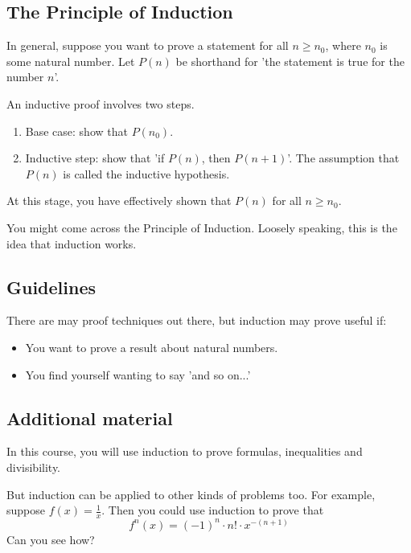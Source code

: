 \documentclass{scrreprt}
\begin{document}
\subsection*{The Principle of Induction}
In general, suppose you want to prove a statement for all $n \geq n_0$, where $n_0$ is some natural number. Let $P(n)$ be shorthand for 'the statement is true for the number $n$'.

An inductive proof involves two steps.
\begin{enumerate}
    \item Base case: show that $P(n_0)$.
    \item Inductive step: show that 'if $P(n)$, then $P(n + 1)$'. The assumption that $P(n)$ is called the inductive hypothesis.
\end{enumerate}
At this stage, you have effectively shown that $P(n)$ for all $n \geq n_0$.

You might come across the Principle of Induction. Loosely speaking, this is the idea that induction works.

\subsection*{Guidelines}
There are may proof techniques out there, but induction may prove useful if:

\begin{itemize}
    \item You want to prove a result about natural numbers.
    \item You find yourself wanting to say 'and so on...'
\end{itemize}

\subsection*{Additional material}
In this course, you will use induction to prove formulas, inequalities and divisibility.

But induction can be applied to other kinds of problems too. For example, suppose $f(x) = \frac{1}{x}$. Then you could use induction to prove that $$f^n(x) = (-1)^n \cdot n! \cdot x^{-(n + 1)}$$ Can you see how?
\end{document}
